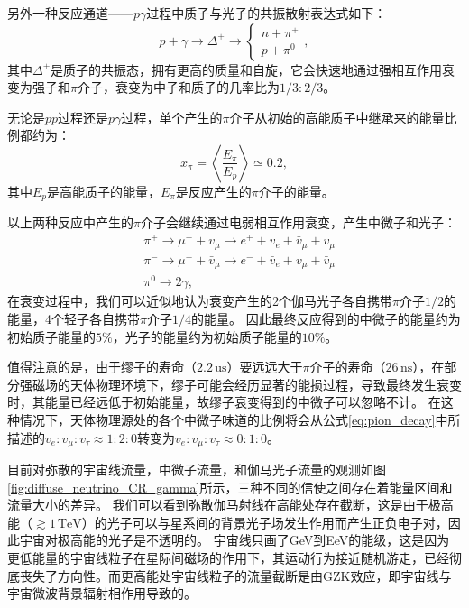 另外一种反应通道——$p\gamma$过程中质子与光子的共振散射表达式如下：
\begin{equation}
    p+\gamma \rightarrow \Delta^{+} 
    \rightarrow\left\{
    \begin{array}{l}
        n+\pi^{+} \\
        p+\pi^0
    \end{array}
    \right. ,
    \label{eq:pgamma_interaction}
\end{equation}
其中$\Delta^{+}$是质子的共振态，拥有更高的质量和自旋，它会快速地通过强相互作用衰变为强子和$\pi$介子，衰变为中子和质子的几率比为$1/3 : 2/3$。

无论是$pp$过程还是$p\gamma$过程，单个产生的$\pi$介子从初始的高能质子中继承来的能量比例都约为：
\begin{equation}
    x_\pi = \left \langle \frac{E_\pi}{E_p} \right \rangle \simeq 0.2 ,
\end{equation}
其中$E_p$是高能质子的能量，$E_\pi$是反应产生的$\pi$介子的能量。

以上两种反应中产生的$\pi$介子会继续通过电弱相互作用衰变，产生中微子和光子：
\begin{equation}
    \begin{aligned}
        & \pi^{+} \rightarrow \mu^{+}+v_\mu \rightarrow e^{+}+v_e+\bar{v}_\mu+v_\mu \\
        & \pi^{-} \rightarrow \mu^{-}+\bar{v}_\mu \rightarrow e^{-}+\bar{v}_e+v_\mu+\bar{v}_\mu \\
        & \pi^0 \rightarrow 2 \gamma ,
        \label{eq:pion_decay}
    \end{aligned}
\end{equation}
在衰变过程中，我们可以近似地认为衰变产生的2个伽马光子各自携带$\pi$介子$1/2$的能量，4个轻子各自携带$\pi$介子$1/4$的能量。
因此最终反应得到的中微子的能量约为初始质子能量的$5\%$，光子的能量约为初始质子能量的$10\%$。

值得注意的是，由于缪子的寿命（$2.2\,\mathrm{us}$）要远远大于$\pi$介子的寿命（$26\,\mathrm{ns}$），在部分强磁场的天体物理环境下，缪子可能会经历显著的能损过程，导致最终发生衰变时，其能量已经远低于初始能量，故缪子衰变得到的中微子可以忽略不计\cite{muon_damp:2005}。
在这种情况下，天体物理源处的各个中微子味道的比例将会从公式\ref{eq:pion_decay}中所描述的$v_e: v_\mu: v_\tau \approx 1: 2: 0$转变为$v_e: v_\mu: v_\tau \approx 0: 1: 0$。

目前对弥散的宇宙线流量，中微子流量，和伽马光子流量的观测如图\ref{fig:diffuse_neutrino_CR_gamma}所示，三种不同的信使之间存在着能量区间和流量大小的差异。
我们可以看到弥散伽马射线在高能处存在截断，这是由于极高能（$\gtrsim 1\,\mathrm{TeV}$）的光子可以与星系间的背景光子场发生作用而产生正负电子对，因此宇宙对极高能的光子是不透明的。
宇宙线只画了GeV到EeV的能级，这是因为更低能量的宇宙线粒子在星际间磁场的作用下，其运动行为接近随机游走，已经彻底丧失了方向性。而更高能处宇宙线粒子的流量截断是由GZK效应，即宇宙线与宇宙微波背景辐射相作用导致的\cite{GZK_G:1966, GZK_ZK:1966}。

